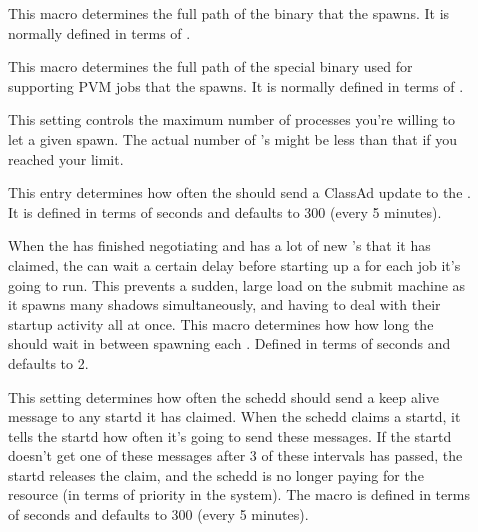 \begin{description}

\item[] \label{param:Shadow} This macro determines the
  full path of the  binary that the 
  spawns.  It is normally defined in terms of . 
  
\item[] \label{param:ShadowPvm} This macro
  determines the full path of the special  binary
  used for supporting PVM jobs that the  spawns.  It is
  normally defined in terms of .

\item[] \label{param:MaxJobsRunning} This
  setting controls the maximum number of  processes
  you're willing to let a given  spawn.  The actual
  number of 's might be less than that if you reached
  your  limit.

\item[] \label{param:ScheddInterval}  This
  entry determines how often the  should send a ClassAd
  update to the .  It is defined in terms of seconds
  and defaults to 300 (every 5 minutes).
  
\item[] \label{param:JobStartDelay} When the
   has finished negotiating and has a lot of new
  's that it has claimed, the  can wait
  a certain delay before starting up a  for each job
  it's going to run.  This prevents a sudden, large load on the submit
  machine as it spawns many shadows simultaneously, and having to deal
  with their startup activity all at once.  This macro determines how
  how long the  should wait in between spawning each
  .  Defined in terms of seconds and defaults to 2. 
  
\item[] \label{param:AliveInterval} This
  setting determines how often the schedd should send a keep alive
  message to any startd it has claimed.  When the schedd claims a
  startd, it tells the startd how often it's going to send these
  messages.  If the startd doesn't get one of these messages after 3
  of these intervals has passed, the startd releases the claim, and
  the schedd is no longer paying for the resource (in terms of
  priority in the system).  The macro is defined in terms of seconds
  and defaults to 300 (every 5 minutes).


\end{description}
